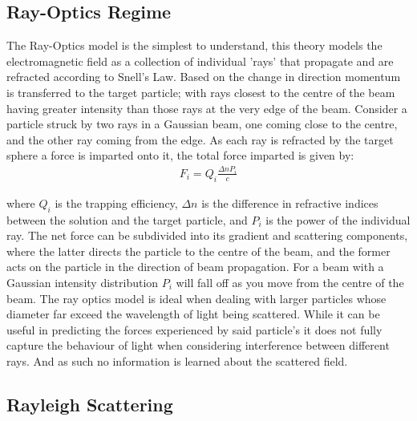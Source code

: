 \subsection{Ray-Optics Regime}

The Ray-Optics model is the simplest to understand, this theory models 
the electromagnetic field as a collection of individual 'rays' that 
propagate and are refracted according to Snell's Law. Based on the 
change in direction momentum is transferred to the target particle; 
with rays closest to the centre of the beam having greater intensity 
than those rays at the very edge of the beam. Consider a particle 
struck by two rays in a Gaussian beam, one coming close to the centre, 
and the other ray coming from the edge. As each ray is refracted by 
the target sphere a force is imparted onto it, the total force 
imparted is given by:
\begin{align}
	F_i = Q_i\frac{\Delta n P_i}{c}
\end{align}

\noindent 
where $Q_i$ is the trapping efficiency, $\Delta n$ is the difference
in refractive indices between the solution and the target particle,
and $P_i$ is the power of the individual ray. The net force can be 
subdivided into its gradient and scattering components, where the latter
directs the particle to the centre of the beam, and the former acts on 
the particle in the direction of beam propagation. For a beam with a
Gaussian intensity distribution $P_i$ will fall off as you move from
the centre of the beam. The ray optics model is ideal when dealing 
with larger particles whose diameter far exceed the wavelength of light
being scattered. While it can be useful in predicting the forces 
experienced by said particle's it does not fully capture the behaviour
of light when considering interference between different rays. And 
as such no information is learned about the scattered field.

\subsection{Rayleigh Scattering}

